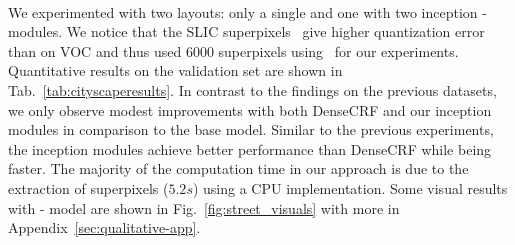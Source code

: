 \begin{figure*}[t]
{  }
  \\[-2ex]
  \setcounter{subfigure}{0}
\label{fig:street_visuals}
\end{figure*}


We experimented with two layouts: only a single 
and one with two inception - modules. We notice that the
SLIC superpixels~\cite{achanta2012slic} give higher quantization error than on VOC
and thus used 6000 superpixels using~\cite{DollarICCV13edges} for our experiments.
Quantitative results on the validation set are
shown in Tab.~\ref{tab:cityscaperesults}. In contrast to the findings on the previous datasets, we only
observe modest improvements with both DenseCRF and our inception modules in comparison
to the base model. Similar to the previous experiments, the inception modules achieve
better performance than DenseCRF while being faster. The majority of the computation
time in our approach is due to the extraction of superpixels
($5.2s$) using a CPU implementation. Some visual results with - model are shown in Fig.~\ref{fig:street_visuals} with more in Appendix~\ref{sec:qualitative-app}.

